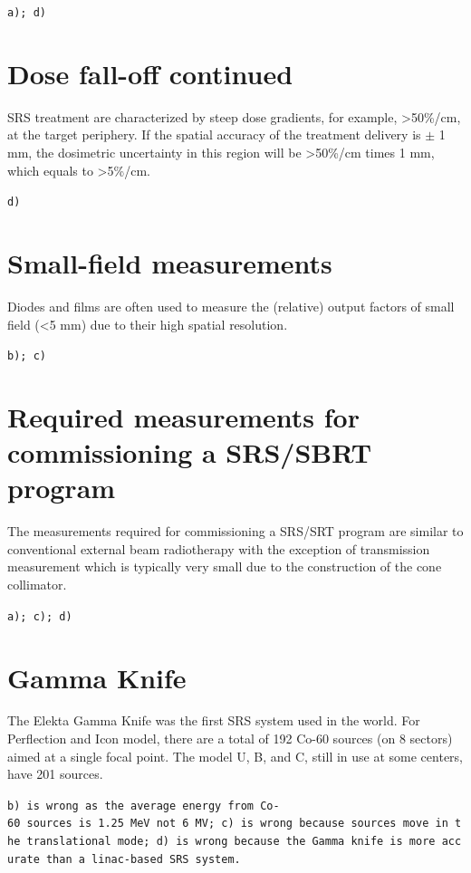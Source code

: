 \documentclass[]{book}
\theoremstyle{definition}
\theoremstyle{definition}
\theoremstyle{definition}
\theoremstyle{remark}
\begin{document}
\texttt{a);\ d)}

\section{Dose fall-off continued}\label{dose-fall-off-continued}

SRS treatment are characterized by steep dose gradients, for example,
\textgreater{}50\%/cm, at the target periphery. If the spatial accuracy
of the treatment delivery is \(\pm\) 1 mm, the dosimetric uncertainty in
this region will be \textgreater{}50\%/cm times 1 mm, which equals to
\textgreater{}5\%/cm.

\texttt{d)}

\section{Small-field measurements}\label{small-field-measurements}

Diodes and films are often used to measure the (relative) output factors
of small field (\textless{}5 mm) due to their high spatial resolution.

\texttt{b);\ c)}

\section{Required measurements for commissioning a SRS/SBRT
program}\label{required-measurements-for-commissioning-a-srssbrt-program}

The measurements required for commissioning a SRS/SRT program are
similar to conventional external beam radiotherapy with the exception of
transmission measurement which is typically very small due to the
construction of the cone collimator.

\texttt{a);\ c);\ d)}

\section{Gamma Knife}\label{gamma-knife}

The Elekta Gamma Knife was the first SRS system used in the world. For
Perflection and Icon model, there are a total of 192 Co-60 sources (on 8
sectors) aimed at a single focal point. The model U, B, and C, still in
use at some centers, have 201 sources.

\texttt{b)\ is\ wrong\ as\ the\ average\ energy\ from\ Co-60\ sources\ is\ 1.25\ MeV\ not\ 6\ MV;\ c)\ is\ wrong\ because\ sources\ move\ in\ the\ translational\ mode;\ d)\ is\ wrong\ because\ the\ Gamma\ knife\ is\ more\ accurate\ than\ a\ linac-based\ SRS\ system.}
\end{document}
